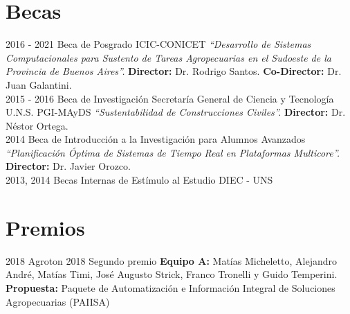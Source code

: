 \documentclass[letterpaper]{twentysecondcv} %
\begin{document}
\vspace{2mm}

\section{Becas}
\begin{twenty}
    \twentyitem
    	{2016 - 2021}
		{}
        {Beca de Posgrado}
        {ICIC-CONICET}
        {\textit{``Desarrollo de Sistemas Computacionales para Sustento de Tareas Agropecuarias en el Sudoeste de la Provincia de Buenos Aires''.}}
        {\textbf{Director:} Dr. Rodrigo Santos. \textbf{Co-Director:} Dr. Juan Galantini.} \\
    \twentyitem
    	{2015 - 2016}
		{}
        {Beca de Investigación}
        {Secretaría General de Ciencia y Tecnología U.N.S.}
        {PGI-MAyDS \textit{``Sustentabilidad de Construcciones Civiles''.}}
        {\textbf{Director:} Dr. Néstor Ortega.} \\
    \twentyitem
    	{2014}
		{}
        {Beca de Introducción a la Investigación para Alumnos Avanzados}
        {}
        {\textit{``Planificación Óptima de Sistemas de Tiempo Real en Plataformas Multicore''.}}
        {\textbf{Director:} Dr. Javier Orozco.} \\
    \twentyitem
    	{2013, 2014}
		{}
        {Becas Internas de Estímulo al Estudio}
        {DIEC - UNS}
        {}
        {} 
\end{twenty}

\section{Premios}
\begin{twenty}
    \twentyitem
    	{2018}
		{}
        {Agroton 2018}
        {Segundo premio}
        {\textbf{Equipo A:} Matías Micheletto, Alejandro André, Matías Timi, José Augusto Strick, Franco Tronelli y Guido Temperini.}
        {\textbf{Propuesta:} Paquete de Automatización e Información Integral de Soluciones Agropecuarias (PAIISA)}
\end{twenty}




\newpage

\end{document}
